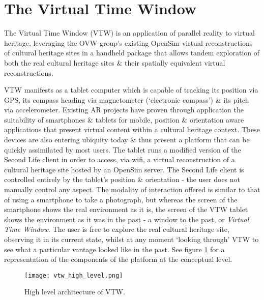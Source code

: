 
\section{The Virtual Time Window}
The Virtual Time Window (VTW) is an application of parallel reality to virtual heritage, leveraging the OVW group's existing OpenSim virtual reconstructions of cultural heritage sites in a handheld package that allows tandem exploration of both the real cultural heritage sites \& their spatially equivalent virtual reconstructions.

VTW manifests as a tablet computer which is capable of tracking its position via GPS, its compass heading via magnetometer (`electronic compass') \& its pitch via accelerometer. Existing AR projects have proven through application the suitability of smartphones \& tablets for mobile, position \& orientation aware applications that present virtual content within a cultural heritage context. These devices are also entering ubiquity today \& thus present a platform that can be quickly assimilated by most users. The tablet runs a modified version of the Second Life client in order to access, via wifi, a virtual reconstruction of a cultural heritage site hosted by an OpenSim server. The Second Life client is controlled entirely by the tablet's position \& orientation - the user does not manually control any aspect. The modality of interaction offered is similar to that of using a smartphone to take a photograph, but whereas the screen of the smartphone shows the real environment as it is, the screen of the VTW tablet shows the environment as it was in the past - a window to the past, or \textit{Virtual Time Window}. The user is free to explore the real cultural heritage site, observing it in its current state, whilst at any moment `looking through' VTW to see what a particular vantage looked like in the past. See figure \ref{vtw_high_level.png} for a representation of the components of the platform at the conceptual level.

\begin{figure}[h]
\centering
  \texttt{[image: vtw\_high\_level.png]}
  \caption{High level architecture of VTW.}
  \label{vtw_high_level.png}
\end{figure}

